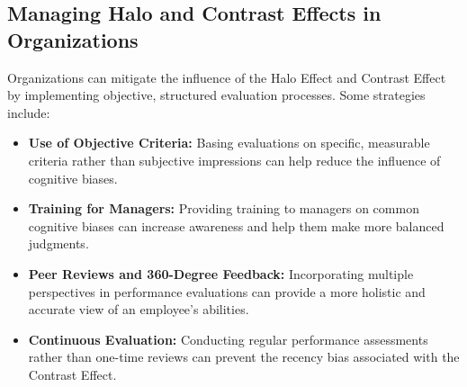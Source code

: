 \documentclass{article}
\begin{document}
\subsection*{Managing Halo and Contrast Effects in Organizations}
Organizations can mitigate the influence of the Halo Effect and Contrast Effect by implementing objective, structured evaluation processes. Some strategies include:

\begin{itemize}
    \item \textbf{Use of Objective Criteria:} Basing evaluations on specific, measurable criteria rather than subjective impressions can help reduce the influence of cognitive biases.
    \item \textbf{Training for Managers:} Providing training to managers on common cognitive biases can increase awareness and help them make more balanced judgments.
    \item \textbf{Peer Reviews and 360-Degree Feedback:} Incorporating multiple perspectives in performance evaluations can provide a more holistic and accurate view of an employee’s abilities.
    \item \textbf{Continuous Evaluation:} Conducting regular performance assessments rather than one-time reviews can prevent the recency bias associated with the Contrast Effect.
\end{itemize}
\end{document}
